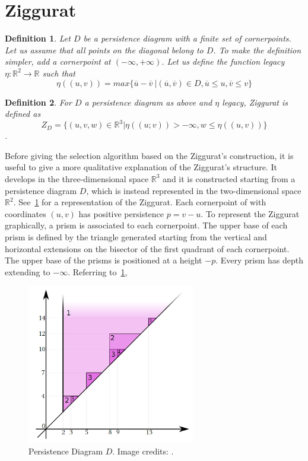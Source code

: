 \documentclass[english, LaM, oneside, noexaminfo]{sapthesis}
\newtheorem{defin}{\bf Definition}[section]
\begin{document}
\section{Ziggurat}

\begin{defin} Let $D$ be a persistence diagram with a finite set of cornerpoints. Let us assume that all points on the diagonal belong to $D$. To make
the definition simpler, add a cornerpoint at $(-\infty, +\infty)$. 
Let us define the function \textit{legacy} $\eta: \mathbb{R}^2 \rightarrow \mathbb{R}$ such that $$\eta((u, v)) = max\{\overline{u} - \overline{v} \ | (\overline{u}, \overline{v}) \in D, \overline{u} \leq u, \overline{v} \leq v\}$$\end{defin}

\begin{defin}\label{def:ziqq}
For $D$ a persistence diagram as above and $\eta$ legacy, \textit{Ziggurat} is defined as $$Z_D = \{(u, v, w) \in \mathbb{R}^3 | \eta((u; v)) > -\infty, w \leq \eta((u,v))\}$$.\end{defin}

Before giving the selection algorithm based on the Ziggurat's construction, it is useful to give a more qualitative explanation of the Ziggurat's structure. It develops in the three-dimensional space $\mathbb{R}^3$ and it is constructed starting from a persistence diagram $D$, which is instead represented in the two-dimensional space $\mathbb{R}^2$.
See~\cref{fig:Ziggurat 2D} for a representation of the Ziggurat. Each cornerpoint of with coordinates $(u, v)$ has positive persistence $p = v - u$.
To represent the Ziggurat graphically, a prism is associated to each cornerpoint. The upper base of each prism
is defined by the triangle generated starting from the vertical and
horizontal extensions on the bisector of the first quadrant of each cornerpoint. The upper base of the prisms is positioned at a height $-p$. Every prism has depth extending to $- \infty$. Referring to~\cref{fig:Ziggurat 2D},

\begin{figure}[tb]
\centering
\includegraphics[height=7cm]{Ziggurat 2D.png}
\caption{Persistence Diagram $D$. Image credits: \cite{student01_my_bachel}.}\label{fig:Ziggurat 2D}
\end{figure}
\end{document}

